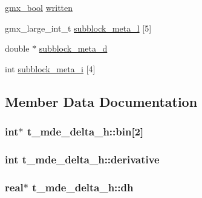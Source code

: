\begin{DoxyCompactItemize}
\item 
\hyperlink{include_2types_2simple_8h_a8fddad319f226e856400d190198d5151}{gmx\-\_\-bool} \hyperlink{structt__mde__delta__h_ab3eb64e59847175ce79b437fcd860f89}{written}
\item 
gmx\-\_\-large\-\_\-int\-\_\-t \hyperlink{structt__mde__delta__h_aa665adee1793ae203f9ba570d02a557f}{subblock\-\_\-meta\-\_\-l} \mbox{[}5\mbox{]}
\item 
double $\ast$ \hyperlink{structt__mde__delta__h_a3b75fa081625283a2dac8e71f6152d5d}{subblock\-\_\-meta\-\_\-d}
\item 
int \hyperlink{structt__mde__delta__h_ab5db9e8595da318aee79eca8d03ebe1d}{subblock\-\_\-meta\-\_\-i} \mbox{[}4\mbox{]}
\end{DoxyCompactItemize}


\subsection{\-Member \-Data \-Documentation}
\hypertarget{structt__mde__delta__h_abf9732bddc23f24a907efa60e5c3ef81}{
\subsubsection[{bin}]{\setlength{\rightskip}{0pt plus 5cm}int$\ast$ {\bf t\-\_\-mde\-\_\-delta\-\_\-h\-::bin}\mbox{[}2\mbox{]}}}\label{structt__mde__delta__h_abf9732bddc23f24a907efa60e5c3ef81}
\hypertarget{structt__mde__delta__h_a723d420e53d749b6c1889aa7c5e1d56b}{
\subsubsection[{derivative}]{\setlength{\rightskip}{0pt plus 5cm}int {\bf t\-\_\-mde\-\_\-delta\-\_\-h\-::derivative}}}\label{structt__mde__delta__h_a723d420e53d749b6c1889aa7c5e1d56b}
\hypertarget{structt__mde__delta__h_a8c16918b4baf8b94184e7c619354be7b}{
\subsubsection[{dh}]{\setlength{\rightskip}{0pt plus 5cm}real$\ast$ {\bf t\-\_\-mde\-\_\-delta\-\_\-h\-::dh}}}\label{structt__mde__delta__h_a8c16918b4baf8b94184e7c619354be7b}

